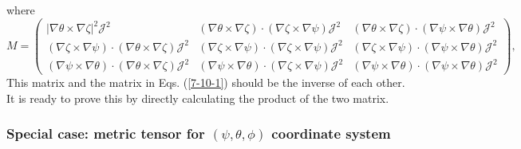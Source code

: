 \documentclass{article}
\begin{document}
where
\[ M = \left(\begin{array}{ccc}
     | \nabla \theta \times \nabla \zeta |^2 \mathcal{J}^2 & (\nabla \theta
     \times \nabla \zeta) \cdot (\nabla \zeta \times \nabla \psi)
     \mathcal{J}^2 & (\nabla \theta \times \nabla \zeta) \cdot (\nabla \psi
     \times \nabla \theta) \mathcal{J}^2\\
     (\nabla \zeta \times \nabla \psi) \cdot (\nabla \theta \times \nabla
     \zeta) \mathcal{J}^2 & (\nabla \zeta \times \nabla \psi) \cdot (\nabla
     \zeta \times \nabla \psi) \mathcal{J}^2 & (\nabla \zeta \times \nabla
     \psi) \cdot (\nabla \psi \times \nabla \theta) \mathcal{J}^2\\
     (\nabla \psi \times \nabla \theta) \cdot (\nabla \theta \times \nabla
     \zeta) \mathcal{J}^2 & (\nabla \psi \times \nabla \theta) \cdot (\nabla
     \zeta \times \nabla \psi) \mathcal{J}^2 & (\nabla \psi \times \nabla
     \theta) \cdot (\nabla \psi \times \nabla \theta) \mathcal{J}^2
   \end{array}\right), \]
This matrix and the matrix in Eqs. (\ref{7-10-1}) should be the inverse of
each other. It is ready to prove this by directly calculating the product of
the two matrix.

\subsubsection{Special case: metric tensor for $(\psi, \theta, \phi)$
coordinate system}
\end{document}
